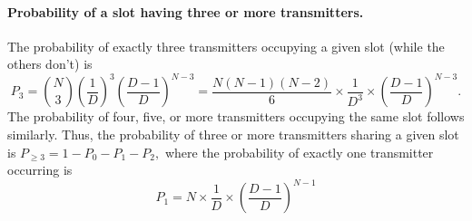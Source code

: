 \documentclass[12pt]{article}
\begin{document}
\paragraph{Probability of a slot having three or more transmitters.} The probability of exactly three transmitters occupying a given slot (while the others don't) is
\[
P_3 = \binom{N}{3} \left(\frac{1}{D}\right)^3 \left(\frac{D-1}{D}\right)^{N-3}
= \frac{N(N-1)(N-2)}{6} \times \frac{1}{D^3} \times \left(\frac{D-1}{D}\right)^{N-3}.
\]
The probability of four, five, or more transmitters occupying the same slot follows similarly. Thus, the probability of three or more transmitters sharing a given slot is
$ %
P_{\geq 3} = 1 - P_0 - P_1 -P_2,
$ %
where the probability of exactly one transmitter occurring is
\[
P_1 = N \times \frac{1}{D} \times \left(\frac{D-1}{D}\right)^{N-1}
\]
\end{document}
